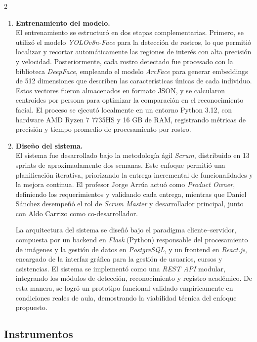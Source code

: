 \documentclass[10pt,a4paper]{article}
\begin{document}
\begin{multicols}{2}
\begin{enumerate}
    \item \textbf{Entrenamiento del modelo.} \\
    El entrenamiento se estructuró en dos etapas complementarias.  
    Primero, se utilizó el modelo \textit{YOLOv8n-Face} para la detección de rostros, lo que permitió localizar y recortar automáticamente las regiones de interés con alta precisión y velocidad.  
    Posteriormente, cada rostro detectado fue procesado con la biblioteca \textit{DeepFace}, empleando el modelo \textit{ArcFace} para generar embeddings de 512 dimensiones que describen las características únicas de cada individuo.  
    Estos vectores fueron almacenados en formato JSON, y se calcularon centroides por persona para optimizar la comparación en el reconocimiento facial.  
    El proceso se ejecutó localmente en un entorno Python 3.12, con hardware AMD Ryzen 7 7735HS y 16 GB de RAM, registrando métricas de precisión y tiempo promedio de procesamiento por rostro.

    \item \textbf{Diseño del sistema.} \\
    El sistema fue desarrollado bajo la metodología ágil \textit{Scrum}, distribuido en 13 sprints de aproximadamente dos semanas.  
    Este enfoque permitió una planificación iterativa, priorizando la entrega incremental de funcionalidades y la mejora continua.  
    El profesor Jorge Arrúa actuó como \textit{Product Owner}, definiendo los requerimientos y validando cada entrega, mientras que Daniel Sánchez desempeñó el rol de \textit{Scrum Master} y desarrollador principal, junto con Aldo Carrizo como co-desarrollador.  

    La arquitectura del sistema se diseñó bajo el paradigma cliente–servidor, compuesta por un backend en \textit{Flask} (Python) responsable del procesamiento de imágenes y la gestión de datos en \textit{PostgreSQL}, y un frontend en \textit{React.js}, encargado de la interfaz gráfica para la gestión de usuarios, cursos y asistencias.  
    El sistema se implementó como una \textit{REST API} modular, integrando los módulos de detección, reconocimiento y registro académico.  
    De esta manera, se logró un prototipo funcional validado empíricamente en condiciones reales de aula, demostrando la viabilidad técnica del enfoque propuesto.

\end{enumerate}

\subsection{Instrumentos}


\end{multicols}
\end{document}
